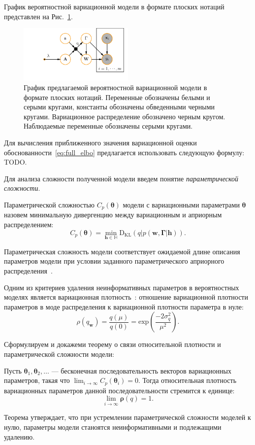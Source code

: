 График вероятностной вариационной модели в формате плоских нотаций представлен на Рис.~\ref{fig:plate_qprob}.
\begin{figure}
\centering
   \includegraphics[width=0.5\textwidth]{plots/notebooks/plate.pdf}
\caption{График предлагаемой вероятностной вариационной модели в формате плоских нотаций. Переменные обозначены белыми и серыми кругами, константы обозначены обведенными черными кругами. Вариационное распределение обозначено черным кругом. Наблюдаемые переменные обозначены серыми кругами.}
\label{fig:plate_qprob}
\end{figure}


Для вычисления приближенного значения вариационной оценки обоснованности~\eqref{eq:full_elbo} предлагается использовать следующую формулу:
TODO.

Для анализа сложности полученной модели введем понятие \textit{параметрической сложности}. 
\begin{defin}
Параметрической сложностью  $C_p(\boldsymbol{\theta})$ модели с вариационными параметрами $\boldsymbol{\theta}$ назовем минимальную дивергенцию между вариационным и априорным распределением:
\[
C_p(\boldsymbol{\theta}) = \min_{\mathbf{h} \in \mathbb{H}} \text{D}_\text{KL}\left(q|p(\mathbf{w}, \boldsymbol{\Gamma}|\mathbf{h})\right).
\]
\end{defin}
Параметрическая сложность модели соответствует ожидаемой длине описания параметров модели при условии заданного параметрического априорного распределения~\cite{hinton_mdl}.

Одним из критериев удаления неинформативных параметров в вероятностных моделях является вариационная плотность~\cite{nips}: отношение вариационной плотности параметров в моде распределения к вариационной плотности параметра в нуле:
\[
    \rho(q_{\mathbf{w}}) = \frac{q(\mu)}{q(0)} = \text{exp}\left(\frac{-2\sigma_q^2}{\mu^2}\right).
\]

Сформулируем и докажеми теорему о связи относительной плотности и параметрической сложности модели:
\begin{theorem}
Пусть $\boldsymbol{\theta}_1,\boldsymbol{\theta}_2,\dots$ --- бесконечная последовательность векторов вариационных параметров, такая что $\lim_{i \to \infty}C_p(\boldsymbol{\theta}_i) = 0$. Тогда относительная плотность вариационных параметров данной последовательности стремится к единице:
\[
    \lim_{i\to\infty} \boldsymbol{\rho}(q) = 1.
\]
\end{theorem}
Теорема утверждает, что при устремлении параметрической сложности моделей к нулю, параметры модели станоятся неинформативными и подлежащими удалению.

